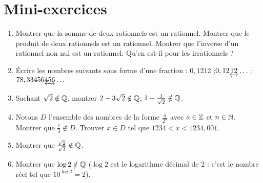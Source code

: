 \section*{Mini-exercices}
 \begin{frame}
 \begin{miniexercice}

\begin{enumerate}
  \item Montrer que la somme de deux rationnels est un rationnel. Montrer que le produit de
deux rationnels est un rationnel. Montrer que l'inverse d'un rationnel non nul est un rationnel.
Qu'en est-il pour les irrationnels ?

  \item \'Ecrire les nombres suivants sous forme d'une fraction :
$0,1212$ ;\quad  $0,12 \underleftrightarrow{12}\ldots$ ;\quad  $78,33456\underleftrightarrow{456}\ldots$

  \item Sachant $\sqrt2\notin \mathbb{Q}$, montrer $2-3\sqrt2 \notin \mathbb{Q}$, $1-\frac{1}{\sqrt2} \notin \mathbb{Q}$. 

  \item Notons $D$ l'ensemble des nombres de la forme $\frac{a}{2^n}$ avec $a\in \mathbb{Z}$ et $n\in \mathbb{N}$.
Montrer que $\frac13 \notin D$. Trouver $x\in D$ tel que $1234<x<1234,001$.

  \item Montrer que $\frac{\sqrt2}{\sqrt3} \notin \mathbb{Q}$.

  \item Montrer que $\log 2 \notin \mathbb{Q}$
($\log 2$ est le logarithme décimal de $2$ : c'est le nombre réel tel que $10^{\log 2} = 2$).
\end{enumerate}

\end{miniexercice}
\end{frame}



